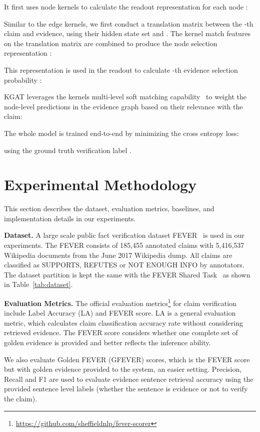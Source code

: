 \documentclass[11pt,a4paper]{article}
\begin{document}
It first uses node kernels to calculate the readout representation  for each node :


Similar to the edge kernels, we first conduct a translation matrix  between the -th claim and evidence, using their hidden state set  and  . The kernel match features   on the translation matrix are combined to produce the node selection representation :


This representation is used in the readout to calculate -th evidence selection probability :


KGAT leverages the kernels multi-level soft matching capability~\citep{xiong2017knrm} to weight the node-level predictions in the evidence graph based on their relevance with the claim:

The whole model is trained end-to-end by minimizing the cross entropy loss:

using the ground truth verification label .

\section{Experimental Methodology}
This section describes the dataset, evaluation metrics, baselines, and implementation details in our experiments.


\textbf{Dataset.}
A large scale public fact verification dataset FEVER~\cite{thorne2018fever} is used in our experiments. The FEVER consists of 185,455 annotated claims with 5,416,537 Wikipedia documents from the June 2017 Wikipedia dump. All claims are classified as SUPPORTS, REFUTES or NOT ENOUGH INFO by annotators. The dataset partition is kept the same with the FEVER Shared Task~\cite{thorne2018fact} as shown in Table~\ref{tab:dataset}.

\textbf{Evaluation Metrics.}
The official evaluation metrics\footnote{\url{https://github.com/sheffieldnlp/fever-scorer}} for claim verification include Label Accuracy (LA) and FEVER score. LA is a general evaluation metric, which calculates claim classification accuracy rate without considering retrieved evidence. The FEVER score considers whether one complete set of golden evidence is provided and better reflects the inference ability.

We also evaluate Golden FEVER (GFEVER) scores, which is the FEVER score but with golden evidence provided to the system, an easier setting. Precision, Recall and F1 are used to evaluate evidence sentence retrieval accuracy using the provided sentence level labels (whether the sentence is evidence or not to verify the claim).
\end{document}

